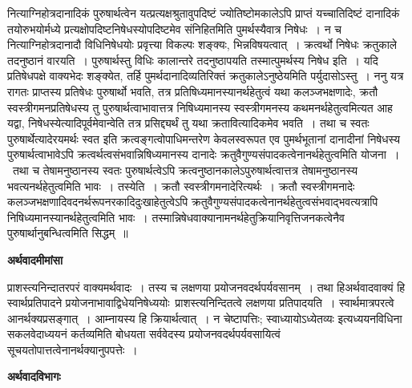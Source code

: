 \documentclass[11pt, openany]{book}
\begin{document}
नित्याग्निहोत्रदानादिकं पुरुषार्थत्वेन यत्प्रत्यक्षश्रुतावुपदिष्टं ज्योतिष्टोमकालेऽपि प्राप्तं यच्चातिदिष्टं दानादिकं तयोरुभयोर्मध्ये प्रत्यक्षोपदिष्टनिषेधस्योपदिष्टमेव संनिहितमिति पुमर्थस्यैवात्र निषेधः~। न च नित्याग्निहोत्रदानादौ विधिनिषेधयोः प्रवृत्त्या  विकल्पः शङ्क्यः, भिन्नविषयत्वात्~। क्रत्वर्थो निषेधः क्रतुकाले तदनुष्ठानं वारयति~। पुरुषार्थस्तु विधिः कालान्तरे तदनुष्ठापयति तस्मात्पुमर्थस्य निषेध इति~। यदि प्रतिषेधपक्षे वाक्यभेदः शङ्क्येत, तर्हि  पुमर्थदानादिव्यतिरिक्तं क्रतुकालेऽनुष्ठेयमिति पर्युदासोऽस्तु~। {\br ननु} यत्र रागतः प्राप्तस्य प्रतिषेधः पुरुषार्थो भवति, तत्र प्रतिषिध्यमानस्यानर्थहेतुत्वं यथा कलञ्जभक्षणादेः, क्रतौ स्वस्त्रीगमनप्रतिषेधस्य तु पुरुषार्थत्वाभावात्तत्र निषिध्यमानस्य स्वस्त्रीगमनस्य कथमनर्थहेतुत्वमित्यत आह यद्वा, {\qt निषेधस्येत्यादिपूर्वमेवान्वेति तत्र प्रसिद्द्यर्थं तु यथा क्रतावित्यादिकमेव भवति}~। तथा च स्वतः पुरुषार्थेत्यादेरयमर्थः {\qt स्वत इति क्रत्वङ्गत्वोपाधिमन्तरेण केवलस्वरूपत एव पुमर्थभूतानां दानादीनां निषेधस्य पुरुषार्थत्वाभावेऽपि क्रत्वर्थत्वसंभवान्निषिध्यमानस्य दानादेः  क्रतुवैगुण्यसंपादकत्वेनानर्थहेतुत्वमिति योजना}~।~तथा च तेषामनुष्ठानस्य स्वतः  पुरुषार्थत्वेऽपि क्रत्वनुष्ठानकालेऽपुरुषार्थत्वात्तत्र तेषामनुष्ठानस्य भवत्यनर्थहेतुत्वमिति भावः~। {\br तस्येति~।} क्रतौ स्वस्त्रीगमनादेरित्यर्थः~। क्रतौ स्वस्त्रीगमनादेः कलञ्जभक्षणादिवदनर्थरूपनरकादिदुःखाहेतुत्वेऽपि
क्रतुवैगुण्यसंपादकत्वेनानर्थहेतुत्वसंभवाद्भवत्यत्रापि निषिध्यमानस्यानर्थहेतुत्वमिति भावः~। {\ab तस्मान्निषेधवाक्यानामनर्थहेतुक्रियानिवृत्तिजनकत्वेनैव पुरुषार्थानुबन्धित्वमिति सिद्धम्~॥}
\newpage
\fancyhead[LO]{[ अर्थवादविभागः ]}
\begin{center}
 \textbf{अर्थवादमीमांसा }   
\end{center}
 
{\bl प्राशस्त्यनिन्दातरपरं वाक्यमर्थवादः~। तस्य च लक्षणया  प्रयोजनवदर्थपर्यवसानम्~। तथा हि\textendash अर्थवादवाक्यं हि स्वार्थप्रतिपादने प्रयोजनाभावाद्विधेयनिषेध्ययोः\footnotemark\ प्राशस्त्यनिन्दितत्वे लक्षणया प्रतिपादयति~। स्वार्थमात्रपरत्वे आनर्थक्यप्रसङ्गात्~। आम्नायस्य हि क्रियार्थत्वात्~। न चेष्टापत्तिः; {\qtl स्वाध्यायोऽध्येतव्यः} इत्यध्ययनविधिना सकलवेदाध्ययनं कर्तव्यमिति बोधयता सर्ववेदस्य प्रयोजनवदर्थपर्यवसायित्वं सूचयतोपात्तत्वेनानर्थक्यानुपपत्तेः~।~}
\begin{center}
 \textbf{अर्थवादविभागः }   
\end{center}
 
\end{document}

